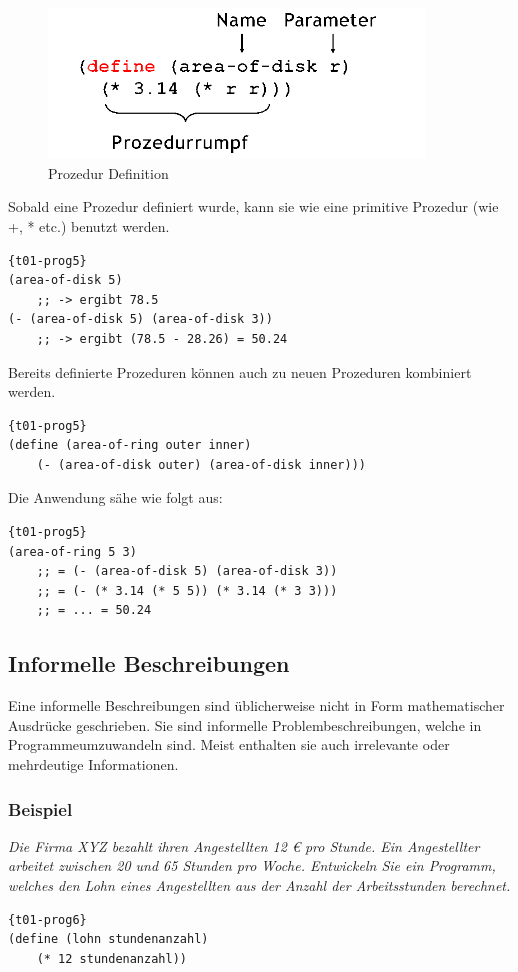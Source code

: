 \begin{figure}
  \includegraphics[height=4cm]{Bilder/T01_def_newproc.png}
  \caption{Prozedur Definition}
  \label{fig:t01_pd}
\end{figure}

Sobald eine Prozedur definiert wurde, kann sie wie eine
primitive Prozedur (wie +, * etc.) benutzt werden.
\begin{lstlisting}{t01-prog5}
(area-of-disk 5)
	;; -> ergibt 78.5
(- (area-of-disk 5) (area-of-disk 3))
	;; -> ergibt (78.5 - 28.26) = 50.24
\end{lstlisting}
Bereits definierte Prozeduren können auch zu neuen Prozeduren
kombiniert werden.
\begin{lstlisting}{t01-prog5}
(define (area-of-ring outer inner)
	(- (area-of-disk outer) (area-of-disk inner)))
\end{lstlisting}
Die Anwendung sähe wie folgt aus:
\begin{lstlisting}{t01-prog5}
(area-of-ring 5 3)
	;; = (- (area-of-disk 5) (area-of-disk 3))
	;; = (- (* 3.14 (* 5 5)) (* 3.14 (* 3 3)))
	;; = ... = 50.24
\end{lstlisting}

\subsection{Informelle Beschreibungen}
Eine informelle Beschreibungen sind üblicherweise nicht in Form mathematischer Ausdrücke geschrieben. Sie sind informelle Problembeschreibungen, welche in Programmeumzuwandeln sind. Meist enthalten sie auch irrelevante oder mehrdeutige Informationen.

\subsubsection{Beispiel}
\textit{Die Firma XYZ bezahlt ihren Angestellten 12 € pro Stunde. Ein Angestellter arbeitet zwischen 20 und 65 Stunden pro Woche. Entwickeln Sie ein Programm, welches den Lohn eines Angestellten aus der Anzahl der Arbeitsstunden berechnet.}
\begin{lstlisting}{t01-prog6}
(define (lohn stundenanzahl)
	(* 12 stundenanzahl))
\end{lstlisting}

